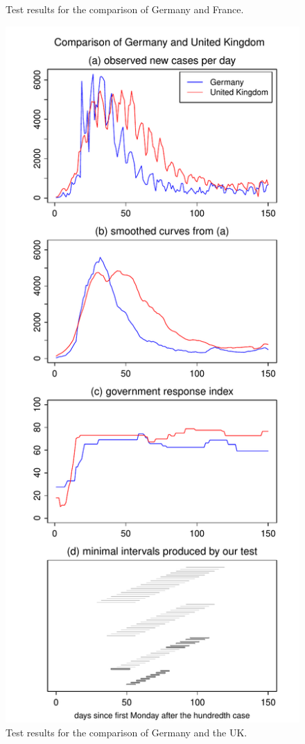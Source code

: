 \documentclass[a4paper,12pt]{article}
\numberwithin{equation}{section}
\begin{document}
\begin{figure}[p!]
\begin{minipage}[t]{0.49\textwidth}
\caption{Test results for the comparison of Germany and France.}\label{fig:Germany:France}
\end{minipage}
\hspace{0.25cm}
\begin{minipage}[t]{0.49\textwidth}
\includegraphics[width=\textwidth]{plots/DEU_vs_GBR_Monday}
\caption{Test results for the comparison of Germany and the UK.}\label{fig:Germany:UK}
\end{minipage}


\end{figure}
\end{document}
